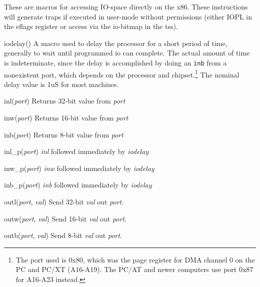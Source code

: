 \begin{apisyn}
\end{apisyn}
\begin{apidesc}
	These are macros for accessing IO-space directly on the
	x86.  These instructions will generate traps if executed
	in user-mode without permissions (either IOPL in the eflags
	register or access via the io-bitmap in the tss).

	\begin{csymlist}
	\item[iodelay()]	
		A macro used to delay the processor for a short period
		of time, generally to wait until programmed io can complete.
		The actual amount of time is indeterminate, since the delay is
		accomplished by doing an {\tt inb} from a nonexistent port,
		which depends on the processor and chipset.\footnote{%
			The port used is 0x80, which was the
			page register for DMA channel 0
			on the PC and PC/XT (A16-A19).
			The PC/AT and newer computers use port
			0x87 for A16-A23 instead.
		}
		The nominal delay value is 1uS for most machines.

	\item[inl(\emph{port})]	\label{inl}
		Returns 32-bit value from \emph{port}
	\item[inw(\emph{port})]	\label{inw}
		Returns 16-bit value from \emph{port}
	\item[inb(\emph{port})]	\label{inb}
		Returns 8-bit value from \emph{port}

	\item[inl_p(\emph{port})]	\label{inl-p}
		\emph{inl} followed immediately by \emph{iodelay}
	\item[inw_p(\emph{port})]	\label{inw-p}
		\emph{inw} followed immediately by \emph{iodelay}
	\item[inb_p(\emph{port})]	\label{inb-p}
		\emph{inb} followed immediately by \emph{iodelay}

	\item[outl(\emph{port}, \emph{val})]	\label{outl}
		Send 32-bit \emph{val} out \emph{port}.
	\item[outw(\emph{port}, \emph{val})]	\label{outw}
		Send 16-bit \emph{val} out \emph{port}.
	\item[outb(\emph{port}, \emph{val})]	\label{outb}
		Send 8-bit \emph{val} out \emph{port}.


\end{csymlist}
\end{apidesc}
